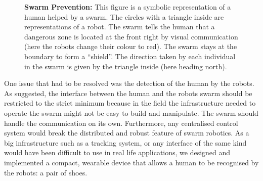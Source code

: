 \documentclass[oneside, a4paper, 12pt]{memoir}
\newcommand{\epuck}[3][0] %
{
	\draw [very thick, fill=white] (#2,#3) circle [radius=0.5];
	\draw [very thick, rotate around={#1:(#2,#3)}] (#2-0.25,#3-0.433) -- (#2,#3+0.45) -- (#2+0.25,#3-0.433);
}
\newcommand{\epuckred}[3][0] %
{
	\draw [very thick, fill=orange] (#2,#3) circle [radius=0.5];
	\draw [very thick, rotate around={#1:(#2,#3)}] (#2-0.25,#3-0.433) -- (#2,#3+0.45) -- (#2+0.25,#3-0.433);
}
\newcommand{\human}[3][0] %
{
	\draw [very thick, fill=white, rotate around={#1:(#2,#3)}] (#2-1,#3+0.5) ellipse (0.25cm and 0.5cm);
	\draw [very thick, fill=white, rotate around={#1:(#2,#3)}] (#2+1,#3+0.5) ellipse (0.25cm and 0.5cm);
	\draw [very thick, fill=white, rotate around={#1:(#2,#3)}] (#2,#3) ellipse (1.5cm and 0.75cm);
	\draw [thick, fill=white, rotate around={#1:(#2,#3)}] (#2-0.05,#3+1) -- (#2,#3+1.1) -- (#2+0.05,#3+1);
	\draw [very thick, fill=white, rotate around={#1:(#2,#3)}] (#2,#3+0.5) circle [radius=0.5cm];
}
\let\oldCaption\caption
\renewcommand{\caption}[2]{
\oldCaption[#1]{{\small\sffamily\bfseries #1:} #2}
}
\begin{document}
	\begin{figure}\centering
		
		\caption{Swarm Prevention}{This figure is a symbolic representation of a human helped by a swarm. The circles with a triangle inside are representations of a robot. The swarm tells the human that a dangerous zone is located at the front right by visual communication (here the robots change their colour to red). The swarm stays at the boundary to form a \enquote{shield}. The direction taken by each individual in the swarm is given by the triangle inside (here heading north).}
		\label{fig:swarm_preventing}
	\end{figure}
	
	One issue that had to be resolved was the detection of the human by the robots. As \citet{podevijn2012self} suggested, the interface between the human and the robots swarm should be restricted to the strict minimum because in the field the infrastructure needed to operate the swarm might not be easy to build and manipulate. The swarm should handle the communication on its own. Furthermore, any centralised control system would break the distributed and robust feature of swarm robotics. As a big infrastructure such as a tracking system, or any interface of the same kind would have been difficult to use in real life applications, we designed and implemented a compact, wearable device that allows a human to be recognised by the robots: a pair of shoes.\\
	
\end{document}
